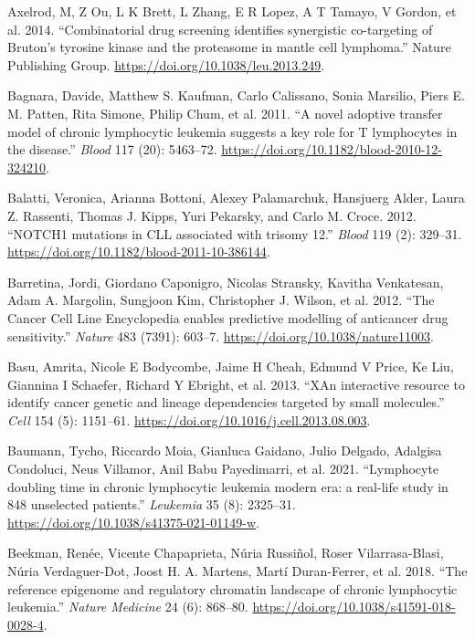 \documentclass[11pt, a4paper, twosided]{book}
\newenvironment{CSLReferences}%
  {}%
  {\par}
\begin{document}
\begin{CSLReferences}{1}{0}
\leavevmode{}%
Axelrod, M, Z Ou, L K Brett, L Zhang, E R Lopez, A T Tamayo, V Gordon, et al. 2014. {``{Combinatorial drug screening identifies synergistic co-targeting of Bruton's tyrosine kinase and the proteasome in mantle cell lymphoma}.''} Nature Publishing Group. \url{https://doi.org/10.1038/leu.2013.249}.

\leavevmode{}%
Bagnara, Davide, Matthew S. Kaufman, Carlo Calissano, Sonia Marsilio, Piers E. M. Patten, Rita Simone, Philip Chum, et al. 2011. {``{A novel adoptive transfer model of chronic lymphocytic leukemia suggests a key role for T lymphocytes in the disease}.''} \emph{Blood} 117 (20): 5463--72. \url{https://doi.org/10.1182/blood-2010-12-324210}.

\leavevmode{}%
Balatti, Veronica, Arianna Bottoni, Alexey Palamarchuk, Hansjuerg Alder, Laura Z. Rassenti, Thomas J. Kipps, Yuri Pekarsky, and Carlo M. Croce. 2012. {``{NOTCH1 mutations in CLL associated with trisomy 12}.''} \emph{Blood} 119 (2): 329--31. \url{https://doi.org/10.1182/blood-2011-10-386144}.

\leavevmode{}%
Barretina, Jordi, Giordano Caponigro, Nicolas Stransky, Kavitha Venkatesan, Adam A. Margolin, Sungjoon Kim, Christopher J. Wilson, et al. 2012. {``{The Cancer Cell Line Encyclopedia enables predictive modelling of anticancer drug sensitivity}.''} \emph{Nature} 483 (7391): 603--7. \url{https://doi.org/10.1038/nature11003}.

\leavevmode{}%
Basu, Amrita, Nicole E Bodycombe, Jaime H Cheah, Edmund V Price, Ke Liu, Giannina I Schaefer, Richard Y Ebright, et al. 2013. {``{XAn interactive resource to identify cancer genetic and lineage dependencies targeted by small molecules}.''} \emph{Cell} 154 (5): 1151--61. \url{https://doi.org/10.1016/j.cell.2013.08.003}.

\leavevmode{}%
Baumann, Tycho, Riccardo Moia, Gianluca Gaidano, Julio Delgado, Adalgisa Condoluci, Neus Villamor, Anil Babu Payedimarri, et al. 2021. {``{Lymphocyte doubling time in chronic lymphocytic leukemia modern era: a real-life study in 848 unselected patients}.''} \emph{Leukemia} 35 (8): 2325--31. \url{https://doi.org/10.1038/s41375-021-01149-w}.

\leavevmode{}%
Beekman, Renée, Vicente Chapaprieta, Núria Russiñol, Roser Vilarrasa-Blasi, Núria Verdaguer-Dot, Joost H. A. Martens, Martí Duran-Ferrer, et al. 2018. {``{The reference epigenome and regulatory chromatin landscape of chronic lymphocytic leukemia}.''} \emph{Nature Medicine} 24 (6): 868--80. \url{https://doi.org/10.1038/s41591-018-0028-4}.


\end{CSLReferences}
\end{document}
